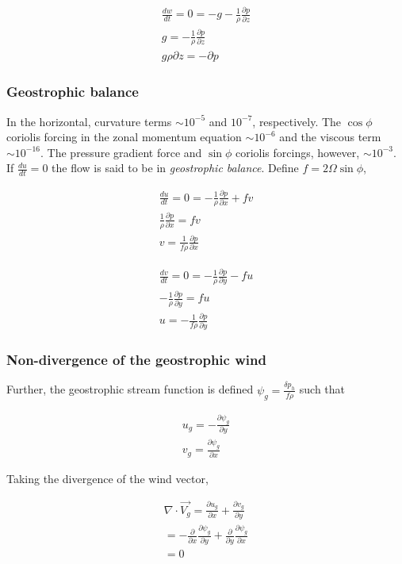 \documentclass[a4paper,12pt]{article}
\begin{document}
\begin{align}
\frac{dw}{dt} = 0 = -g - \frac{1}{\rho}\frac{\partial p}{\partial z}\\
g = -\frac{1}{\rho}\frac{\partial p}{\partial z}\\
\boxed{g\rho\partial z = -\partial p}
\end{align}

\subsubsection*{Geostrophic balance}
In the horizontal, curvature terms $\sim 10^{-5}$ and $10^{-7}$, respectively. The $\cos\phi$ coriolis forcing in the zonal momentum equation $\sim 10^{-6}$ and the viscous term $\sim 10^{-16}$. The pressure gradient force and $\sin\phi$ coriolis forcings, however, $\sim 10^{-3}$. If $\frac{du}{dt} = 0$ the flow is said to be in \emph{geostrophic balance}.
Define $ f = 2\Omega\sin\phi$,

\begin{align}
\frac{du}{dt} = 0 = -\frac{1}{\rho}\frac{\partial p}{\partial x}+ fv\\
\frac{1}{\rho}\frac{\partial p}{\partial x} = fv\\
\boxed{v = \frac{1}{f\rho}\frac{\partial p}{\partial x}}
\end{align}

\begin{align}
\frac{dv}{dt} = 0 = -\frac{1}{\rho}\frac{\partial p}{\partial y} - fu\\
-\frac{1}{\rho}\frac{\partial p}{\partial y} = fu\\
\boxed{u = -\frac{1}{f\rho}\frac{\partial p}{\partial y}}
\end{align}

\subsubsection*{Non-divergence of the geostrophic wind}
Further, the geostrophic stream function is defined $\psi_g = \frac{\delta p_{h}}{f\rho}$ such that

\begin{align}
u_g = -\frac{\partial\psi_g}{\partial y}\\
v_g = \frac{\partial\psi_g}{\partial x}
\end{align}

Taking the divergence of the wind vector,

\begin{align}
\nabla \cdot \vec{V_g} = \frac{\partial u_g}{\partial x} + \frac{\partial v_g}{\partial y}\\
= -\frac{\partial}{\partial x}\frac{\partial \psi_g}{\partial y} + \frac{\partial}{\partial y}\frac{\partial \psi_g}{\partial x}\\
= 0
\end{align}
\end{document}
